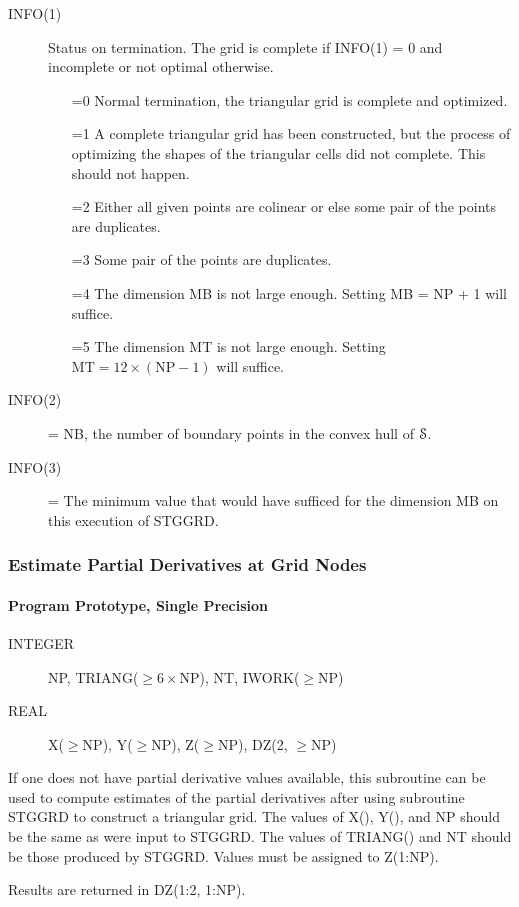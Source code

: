 \documentclass[twoside]{MATH77}
\begin{document}
\begin{description}
\begin{description}
\item[INFO(1)] Status on termination.  The grid is complete if INFO(1) = 0
and incomplete or not optimal otherwise.
\begin{itemize}
\item[=0] Normal termination, the triangular grid is complete and optimized.
\item[=1] A complete triangular grid has been constructed, but the process
of optimizing the shapes of the triangular cells did not complete.
This should not happen.
\item[=2] Either all given points are colinear or else some
pair of the points are duplicates.
\item[=3] Some pair of the points are duplicates.
\item[=4] The dimension MB is not large enough.  Setting MB =
NP + 1 will suffice.
\item[=5] The dimension MT is not large enough.
Setting $\text{MT} = 12 \times (\text{NP}-1)$ will suffice.
\end{itemize}
\item[INFO(2)] = NB, the number of boundary points in the convex
hull of {$\EuScript S$}.
\item[INFO(3)] = The minimum value that would have sufficed for
the dimension MB on this execution of STGGRD.
\end{description}
\end{description}

\subsubsection{Estimate Partial Derivatives at Grid Nodes}

\paragraph{Program Prototype, Single Precision}

\begin{description}
\item[INTEGER]  NP, TRIANG($\geq 6 \times$NP), NT,\newline
IWORK($\geq $NP)
\item[REAL] X($\geq$NP), Y($\geq$NP), Z($\geq$NP), DZ(2, $\geq$NP)
\end{description}
If one does not have partial derivative values available, this
subroutine can be used to compute estimates of the partial derivatives
after using subroutine STGGRD to
construct a triangular grid.  The values of X(), Y(), and NP
should be the same as were input to STGGRD.  The values of TRIANG()
and NT should be those produced by STGGRD.  Values must be
assigned to Z(1:NP).
\begin{center}
\end{center}
Results are returned in DZ(1:2, 1:NP).
\end{document}
